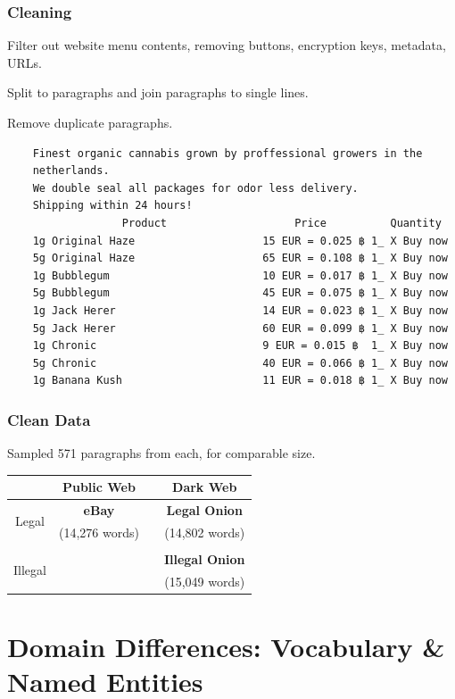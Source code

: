 \documentclass[t,xcolor={svgnames,table}]{beamer}
\begin{document}
\begin{frame}[fragile]
	\frametitle{Cleaning}
	
	Filter out website menu contents, removing buttons, encryption keys, metadata, URLs.
	\vfill
	
	Split to paragraphs and join paragraphs to single lines.
	\vfill
	
	Remove duplicate paragraphs.
	\vfill
	
	\small
\begin{verbatim}
	Finest organic cannabis grown by proffessional growers in the
	netherlands.
	We double seal all packages for odor less delivery.
	Shipping within 24 hours!
	              Product                    Price          Quantity
	1g Original Haze                    15 EUR = 0.025 ฿ 1_ X Buy now
	5g Original Haze                    65 EUR = 0.108 ฿ 1_ X Buy now
	1g Bubblegum                        10 EUR = 0.017 ฿ 1_ X Buy now
	5g Bubblegum                        45 EUR = 0.075 ฿ 1_ X Buy now
	1g Jack Herer                       14 EUR = 0.023 ฿ 1_ X Buy now
	5g Jack Herer                       60 EUR = 0.099 ฿ 1_ X Buy now
	1g Chronic                          9 EUR = 0.015 ฿  1_ X Buy now
	5g Chronic                          40 EUR = 0.066 ฿ 1_ X Buy now
	1g Banana Kush                      11 EUR = 0.018 ฿ 1_ X Buy now
\end{verbatim}
\end{frame}

\begin{frame}
	\frametitle{Clean Data}

	Sampled 571 paragraphs from each, for comparable size.
	
	\begin{center}
	\def\arraystretch{2}
	\begin{tabular}{c|ccc}
	& Public Web && Dark Web \\ 
	\hline
	\multirow{2}{*}{Legal} & \textbf{\color{yellow} eBay} && \textbf{\color{green} Legal Onion} \\
	& (14,276 words) && (14,802 words) \\\\
	\multirow{2}{*}{Illegal} &&& \textbf{\color{red} Illegal Onion} \\
	&&& (15,049 words)
	\end{tabular}
	\end{center}
\end{frame}

\section{Domain Differences: Vocabulary \& Named Entities}
\end{document}
